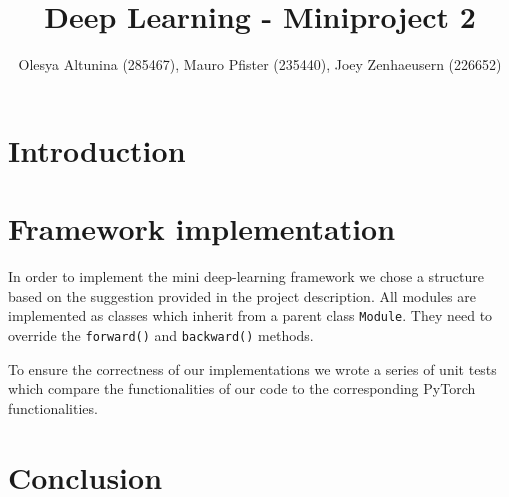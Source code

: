 \documentclass[10pt,conference,compsocconf]{IEEEtran}
\begin{document}
\title{Deep Learning - Miniproject 2}

\author{
  Olesya Altunina (285467), Mauro Pfister (235440), Joey Zenhaeusern (226652)
}

\maketitle

\begin{abstract}

\end{abstract}

\section{Introduction}

\section{Framework implementation}
In order to implement the mini deep-learning framework we chose a structure based on the suggestion provided in the project description. All modules are implemented as classes which inherit from a parent class \texttt{Module}. They need to override the \texttt{forward()} and \texttt{backward()} methods.

To ensure the correctness of our implementations we wrote a series of unit tests which compare the functionalities of our code to the corresponding PyTorch functionalities.

\section{Conclusion}




\end{document}
